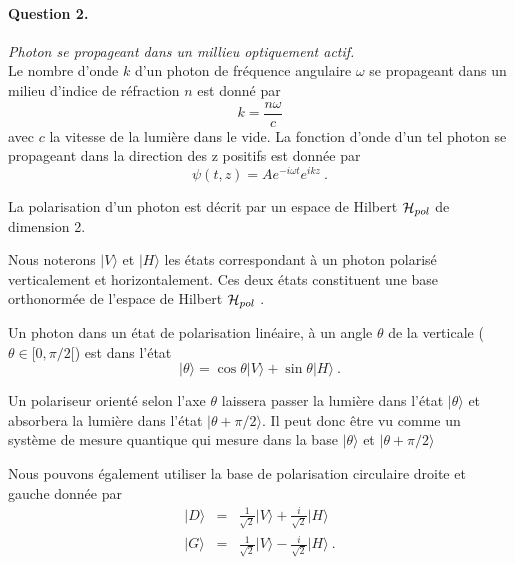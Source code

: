 \paragraph{Question 2.} \textit{Photon se propageant dans un millieu optiquement actif.} \\






Le nombre d'onde $k$ d'un photon de fréquence angulaire $\omega$ se propageant dans un milieu d'indice de réfraction $n$ est donné par
\begin{equation}
k= \frac{n \omega}{c} 
\end{equation}
avec $c$ la vitesse de la lumière dans le vide.
La fonction d'onde d'un tel photon se propageant dans la direction des z positifs est donnée par
\begin{equation}
\psi(t,z) = A e^{-i \omega t} e^{i k z}\ .
\end{equation}


La polarisation d'un photon est décrit par un espace de Hilbert ${\cal H}_{pol}$ de dimension 2.

Nous noterons $\vert V\rangle$ et $\vert H\rangle$ les états correspondant à un photon polarisé verticalement et horizontalement. Ces deux états constituent une base orthonormée de l'espace de Hilbert ${\cal H}_{pol}$ .

Un photon dans un état de polarisation linéaire, à un angle $\theta$ de la verticale ($\theta \in [0,\pi/2[$) est dans l'état 
\begin{equation}
\vert \theta \rangle = \cos \theta \vert V\rangle + \sin \theta \vert H\rangle\ .
\label{eq:theta}
\end{equation}

Un polariseur orienté selon l'axe $\theta$ laissera passer la lumière dans l'état 
$\vert \theta \rangle$ et absorbera la lumière dans l'état $\vert \theta + \pi/2 \rangle$. Il peut donc être vu comme un système de mesure quantique qui mesure dans la base $\vert \theta \rangle$ et $\vert \theta +\pi/2 \rangle$


Nous pouvons également utiliser la base de polarisation circulaire droite et gauche donnée par 
\begin{eqnarray}
\vert D \rangle &=& \frac{1}{\sqrt{2}} \vert V\rangle + \frac{i}{\sqrt{2}} \vert H\rangle\nonumber\\
\vert G \rangle &=& \frac{1}{\sqrt{2}} \vert V\rangle - \frac{i}{\sqrt{2}} \vert H\rangle\ .
\end{eqnarray}



